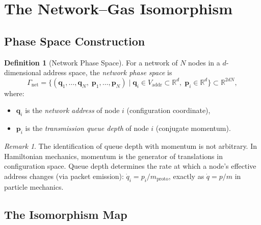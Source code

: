\documentclass[11pt,twocolumn,a4paper]{article}
\theoremstyle{definition}
\newtheorem{definition}[theorem]{Definition}
\theoremstyle{remark}
\newtheorem{remark}[theorem]{Remark}
\newcommand{\Vaddr}{V_{\mathrm{addr}}}
\newcommand{\mpr}{m_{\mathrm{proto}}}
\begin{document}
\section{The Network--Gas Isomorphism}\label{sec:isomorphism}

\subsection{Phase Space Construction}\label{sec:phase_space}

\begin{definition}[Network Phase Space]\label{def:phase_space}
For a network of $N$ nodes in a $d$-dimensional address space, the
\emph{network phase space} is
\begin{equation}\label{eq:phase_space}
  \Gamma_{\mathrm{net}} = \bigl\{
    (\bm{q}_1,\ldots,\bm{q}_N,\;\bm{p}_1,\ldots,\bm{p}_N)
    \;\big|\;
    \bm{q}_i\in\Vaddr\subset\mathbb{R}^d,\;
    \bm{p}_i\in\mathbb{R}^d
  \bigr\}\subset\mathbb{R}^{2dN},
\end{equation}
where:
\begin{itemize}
  \item $\bm{q}_i$ is the \emph{network address} of node $i$ (configuration
        coordinate),
  \item $\bm{p}_i$ is the \emph{transmission queue depth} of node $i$
        (conjugate momentum).
\end{itemize}
\end{definition}

\begin{remark}
The identification of queue depth with momentum is not arbitrary.  In
Hamiltonian mechanics, momentum is the generator of translations in
configuration space.  Queue depth determines the rate at which a node's
effective address changes (via packet emission): $\dot{q}_i=p_i/\mpr$,
exactly as $\dot{q}=p/m$ in particle mechanics.
\end{remark}

\subsection{The Isomorphism Map}\label{sec:iso_map}
\end{document}
